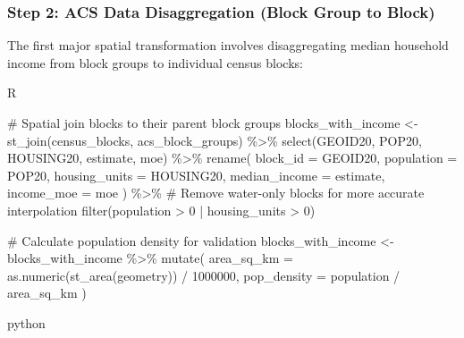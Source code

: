 \documentclass[
  letterpaper,
  DIV=11,
  numbers=noendperiod]{scrartcl}
\newenvironment{Shaded}{\begin{snugshade}}{\end{snugshade}}
\newcommand{\AttributeTok}[1]{\textcolor[rgb]{0.40,0.45,0.13}{#1}}
\newcommand{\CommentTok}[1]{\textcolor[rgb]{0.37,0.37,0.37}{#1}}
\newcommand{\DecValTok}[1]{\textcolor[rgb]{0.68,0.00,0.00}{#1}}
\newcommand{\FunctionTok}[1]{\textcolor[rgb]{0.28,0.35,0.67}{#1}}
\newcommand{\NormalTok}[1]{\textcolor[rgb]{0.00,0.23,0.31}{#1}}
\newcommand{\OtherTok}[1]{\textcolor[rgb]{0.00,0.23,0.31}{#1}}
\newcommand{\SpecialCharTok}[1]{\textcolor[rgb]{0.37,0.37,0.37}{#1}}
\begin{document}
\subsubsection{Step 2: ACS Data Disaggregation (Block Group to
Block)}\label{step-2-acs-data-disaggregation-block-group-to-block}

The first major spatial transformation involves disaggregating median
household income from block groups to individual census blocks:

R

\begin{Shaded}
\begin{Highlighting}[]
\CommentTok{\# Spatial join blocks to their parent block groups}
\NormalTok{blocks\_with\_income }\OtherTok{\textless{}{-}} \FunctionTok{st\_join}\NormalTok{(census\_blocks, acs\_block\_groups) }\SpecialCharTok{\%\textgreater{}\%}
  \FunctionTok{select}\NormalTok{(GEOID20, POP20, HOUSING20, estimate, moe) }\SpecialCharTok{\%\textgreater{}\%}
  \FunctionTok{rename}\NormalTok{(}
    \AttributeTok{block\_id =}\NormalTok{ GEOID20,}
    \AttributeTok{population =}\NormalTok{ POP20,}
    \AttributeTok{housing\_units =}\NormalTok{ HOUSING20,}
    \AttributeTok{median\_income =}\NormalTok{ estimate,}
    \AttributeTok{income\_moe =}\NormalTok{ moe}
\NormalTok{  ) }\SpecialCharTok{\%\textgreater{}\%}
  \CommentTok{\# Remove water{-}only blocks for more accurate interpolation}
  \FunctionTok{filter}\NormalTok{(population }\SpecialCharTok{\textgreater{}} \DecValTok{0} \SpecialCharTok{|}\NormalTok{ housing\_units }\SpecialCharTok{\textgreater{}} \DecValTok{0}\NormalTok{)}

\CommentTok{\# Calculate population density for validation}
\NormalTok{blocks\_with\_income }\OtherTok{\textless{}{-}}\NormalTok{ blocks\_with\_income }\SpecialCharTok{\%\textgreater{}\%}
  \FunctionTok{mutate}\NormalTok{(}
    \AttributeTok{area\_sq\_km =} \FunctionTok{as.numeric}\NormalTok{(}\FunctionTok{st\_area}\NormalTok{(geometry)) }\SpecialCharTok{/} \DecValTok{1000000}\NormalTok{,}
    \AttributeTok{pop\_density =}\NormalTok{ population }\SpecialCharTok{/}\NormalTok{ area\_sq\_km}
\NormalTok{  )}
\end{Highlighting}
\end{Shaded}

python
\end{document}
